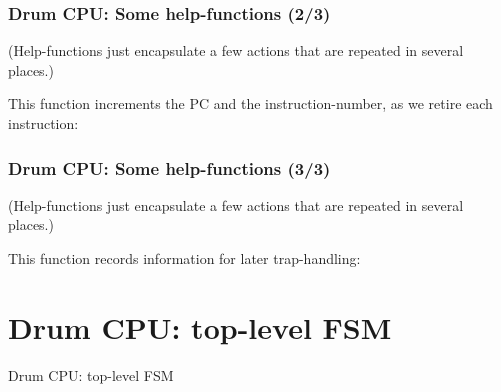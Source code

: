 
\begin{frame}[fragile]
\frametitle{Drum CPU: Some help-functions (2/3)}

\footnotesize

(Help-functions just encapsulate a few actions that are repeated in several places.)

\vspace{5ex}

This function increments the PC and the instruction-number, as we retire each instruction:

\vspace{4ex}

\begin{minipage}{0.725\textwidth}
\end{minipage}

\end{frame}


\begin{frame}[fragile]
\frametitle{Drum CPU: Some help-functions (3/3)}

\footnotesize

(Help-functions just encapsulate a few actions that are repeated in several places.)

\vspace{5ex}

This function records information for later trap-handling:

\vspace{4ex}

\begin{minipage}{0.725\textwidth}
\end{minipage}

\end{frame}


\section{Drum CPU: top-level FSM}

\begin{frame}[fragile]

\begin{center}
  {\LARGE Drum CPU: top-level FSM}
\end{center}

\end{frame}

